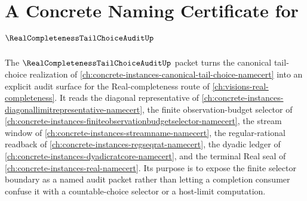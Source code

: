 \chapter{A Concrete Naming Certificate for $\RealCompletenessTailChoiceAuditUp$}
\label{ch:concrete-instances-real-completeness-tail-choice-audit-namecert}

The $\RealCompletenessTailChoiceAuditUp$ packet turns the canonical tail-choice realization of \autoref{ch:concrete-instances-canonical-tail-choice-namecert} into an explicit audit surface for the Real-completeness route of \autoref{ch:visions-real-completeness}. It reads the diagonal representative of \autoref{ch:concrete-instances-diagonallimitrepresentative-namecert}, the finite observation-budget selector of \autoref{ch:concrete-instances-finiteobservationbudgetselector-namecert}, the stream window of \autoref{ch:concrete-instances-streamname-namecert}, the regular-rational readback of \autoref{ch:concrete-instances-regseqrat-namecert}, the dyadic ledger of \autoref{ch:concrete-instances-dyadicratcore-namecert}, and the terminal Real seal of \autoref{ch:concrete-instances-real-namecert}. Its purpose is to expose the finite selector boundary as a named audit packet rather than letting a completion consumer confuse it with a countable-choice selector or a host-limit computation.



